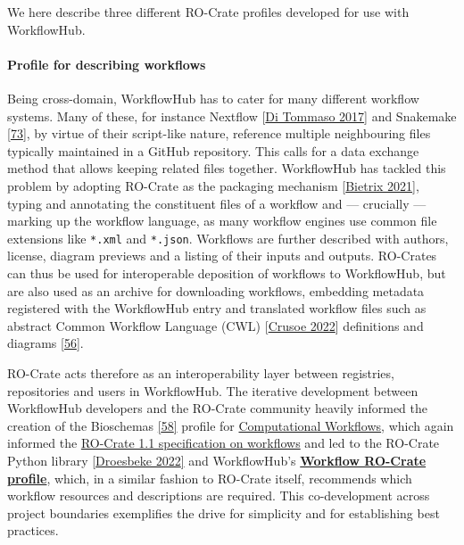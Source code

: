 We here describe three different RO-Crate profiles developed for use
with WorkflowHub.

\hypertarget{profile-for-describing-workflows}{%
\paragraph{Profile for describing
workflows}\label{profile-for-describing-workflows}}

Being cross-domain, WorkflowHub has to cater for many different workflow
systems. Many of these, for instance Nextflow
{[}\href{https://doi.org/10.1038/nbt.3820}{Di Tommaso 2017}{]} and Snakemake
{[}\href{https://doi.org/10.1093/bioinformatics/bts480}{73}{]}, by
virtue of their script-like nature, reference multiple neighbouring
files typically maintained in a GitHub repository. This calls for a data
exchange method that allows keeping related files together. WorkflowHub
has tackled this problem by adopting RO-Crate as the packaging mechanism
{[}\href{https://doi.org/10.5281/zenodo.4705078}{Bietrix 2021}{]}, typing and
annotating the constituent files of a workflow and --- crucially ---
marking up the workflow language, as many workflow engines use common
file extensions like \texttt{*.xml} and \texttt{*.json}. Workflows are
further described with authors, license, diagram previews and a listing
of their inputs and outputs. RO-Crates can thus be used for
interoperable deposition of workflows to WorkflowHub, but are also used
as an archive for downloading workflows, embedding metadata registered
with the WorkflowHub entry and translated workflow files such as
abstract Common Workflow Language (CWL)
{[}\href{https://doi.org/10.1145/3486897}{Crusoe 2022}{]} definitions and
diagrams {[}\href{https://doi.org/10.5281/zenodo.4605654}{56}{]}.

RO-Crate acts therefore as an interoperability layer between registries,
repositories and users in WorkflowHub. The iterative development between
WorkflowHub developers and the RO-Crate community heavily informed the
creation of the Bioschemas
\href{https://iswc2017.semanticweb.org/paper-579/}{{[}58{]}} profile for
\href{https://bioschemas.org/profiles/ComputationalWorkflow/1.0-RELEASE/}{Computational
Workflows}, which again informed the
\href{https://www.researchobject.org/ro-crate/1.1/workflows.html}{RO-Crate
1.1 specification on workflows} and led to the RO-Crate Python library
\href{https://doi.org/10.5281/zenodo.3956493}{{[}Droesbeke 2022{]}} and
WorkflowHub's
\href{https://w3id.org/workflowhub/workflow-ro-crate/1.0}{\textbf{Workflow
RO-Crate profile}}, which, in a similar fashion to RO-Crate itself,
recommends which workflow resources and descriptions are required. This
co-development across project boundaries exemplifies the drive for
simplicity and for establishing best practices.

